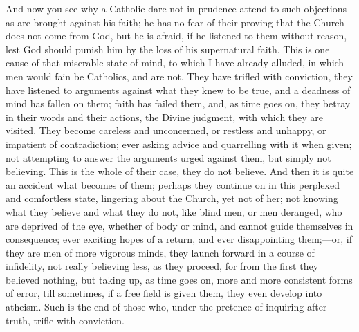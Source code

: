 And now you see why a Catholic dare not in prudence attend to such
objections as are brought against his faith; he has no fear of their
proving that the Church does not come from God, but he is afraid, if
he listened to them without reason, lest God should punish him by the
loss of his supernatural faith. This is one cause of that miserable
state of mind, to which I have already alluded, in which men would
fain be Catholics, and are not. They have trifled with conviction,
they have listened to arguments against what they knew to be true, and
a deadness of mind has fallen on them; faith has failed them, and, as
time goes on, they betray in their words and their actions, the Divine
judgment, with which they are visited. They become careless and
unconcerned, or restless and unhappy, or impatient of contradiction;
ever asking advice and quarrelling with it when given; not attempting
to answer the arguments urged against them, but simply not believing.
This is the whole of their case, they do not believe. And then it is
quite an accident what becomes of them; perhaps they continue on in
this perplexed and comfortless state, lingering about the Church, yet
not of her; not knowing what they believe and what they do not, like
blind men, or men deranged, who are deprived of the eye, whether of
body or mind, and cannot guide themselves in consequence; ever
exciting hopes of a return, and ever disappointing them;—or, if they
are men of more vigorous minds, they launch forward in a course of
infidelity, not really believing less, as they proceed, for from the
first they believed nothing, but taking up, as time goes on, more and
more consistent forms of error, till sometimes, if a free field is
given them, they even develop into atheism. Such is the end of those
who, under the pretence of inquiring after truth, trifle with
conviction.

